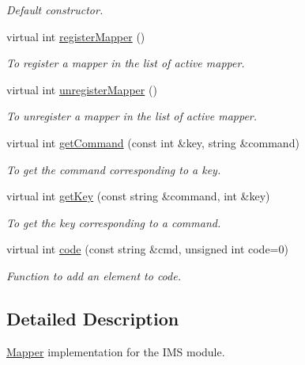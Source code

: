 \begin{DoxyCompactItemize}
\begin{DoxyCompactList}\small\item\em Default constructor. \item\end{DoxyCompactList}\item 
virtual int \hyperlink{classIMSMapper_a5454adaabc0a8049263f2f9c50f71d36}{registerMapper} ()
\begin{DoxyCompactList}\small\item\em To register a mapper in the list of active mapper. \item\end{DoxyCompactList}\item 
virtual int \hyperlink{classIMSMapper_a688bf20409385a8c7505164153d243ac}{unregisterMapper} ()
\begin{DoxyCompactList}\small\item\em To unregister a mapper in the list of active mapper. \item\end{DoxyCompactList}\item 
virtual int \hyperlink{classIMSMapper_a25a97459b750bf8204178b9a18637113}{getCommand} (const int \&key, string \&command)
\begin{DoxyCompactList}\small\item\em To get the command corresponding to a key. \item\end{DoxyCompactList}\item 
virtual int \hyperlink{classIMSMapper_a762164cb091f97d2a4698de59cc66cb5}{getKey} (const string \&command, int \&key)
\begin{DoxyCompactList}\small\item\em To get the key corresponding to a command. \item\end{DoxyCompactList}\item 
virtual int \hyperlink{classIMSMapper_ac972651946c18f94bc683654462ccecd}{code} (const string \&cmd, unsigned int code=0)
\begin{DoxyCompactList}\small\item\em Function to add an element to code. \item\end{DoxyCompactList}\end{DoxyCompactItemize}


\subsection{Detailed Description}
\hyperlink{classMapper}{Mapper} implementation for the IMS module. 

